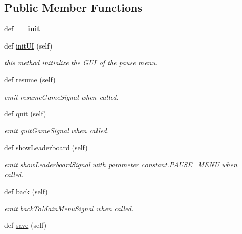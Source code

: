 \subsection*{Public Member Functions}
\begin{DoxyCompactItemize}
\item 
\hypertarget{classsrc_1_1pause__menu_1_1_pause_menu_a50b6571cbb54b07250cf74db412231dd}{}def {\bfseries \+\_\+\+\_\+init\+\_\+\+\_\+}\label{classsrc_1_1pause__menu_1_1_pause_menu_a50b6571cbb54b07250cf74db412231dd}

\item 
def \hyperlink{classsrc_1_1pause__menu_1_1_pause_menu_a9a5e36aa2482be916deefce1f4f23fcb}{init\+U\+I} (self)
\begin{DoxyCompactList}\small\item\em this method initialize the G\+U\+I of the pause menu. \end{DoxyCompactList}\item 
def \hyperlink{classsrc_1_1pause__menu_1_1_pause_menu_aaf160aa602ebd4ec91e9bc32d6d730f9}{resume} (self)
\begin{DoxyCompactList}\small\item\em emit resume\+Game\+Signal when called. \end{DoxyCompactList}\item 
def \hyperlink{classsrc_1_1pause__menu_1_1_pause_menu_a9f29e275aa812da5fad8730a41746677}{quit} (self)
\begin{DoxyCompactList}\small\item\em emit quit\+Game\+Signal when called. \end{DoxyCompactList}\item 
def \hyperlink{classsrc_1_1pause__menu_1_1_pause_menu_a9e3d8c0c94fdf4af682d6988f123888f}{show\+Leaderboard} (self)
\begin{DoxyCompactList}\small\item\em emit show\+Leaderboard\+Signal with parameter \textquotesingle{}constant.\+P\+A\+U\+S\+E\+\_\+\+M\+E\+N\+U\textquotesingle{} when called. \end{DoxyCompactList}\item 
def \hyperlink{classsrc_1_1pause__menu_1_1_pause_menu_affa6df962a7284b81fa60171119585b1}{back} (self)
\begin{DoxyCompactList}\small\item\em emit back\+To\+Main\+Menu\+Signal when called. \end{DoxyCompactList}\item 
def \hyperlink{classsrc_1_1pause__menu_1_1_pause_menu_a6950e08a6f9a87c87e9b77d606117eef}{save} (self)

\end{DoxyCompactItemize}
